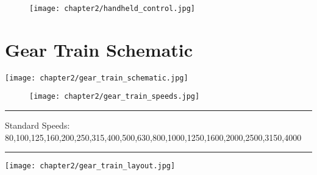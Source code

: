 \begin{figure}[h]
    \centering
    \texttt{[image: chapter2/handheld\_control.jpg]}
\end{figure}

\section{Gear Train Schematic}
\setcounter{section}{10}
\begin{minipage}{\textwidth}
    \begin{adjustwidth}{-2cm}{-3cm}
        \centering
        \texttt{[image: chapter2/gear\_train\_schematic.jpg]}
    \end{adjustwidth}
    \label{fig:gear_train}
\end{minipage}


\vspace{-.5cm}

\begin{figure}[h]
    \centering
    \texttt{[image: chapter2/gear\_train\_speeds.jpg]}
\end{figure}

\noindent \rule{1.08\textwidth}{0.5pt}
\footnotesize Standard Speeds: 80,100,125,160,200,250,315,400,500,630,800,1000,1250,1600,2000,2500,3150,4000
\rule{1.08\textwidth}{0.5pt}

\vspace{.5cm}

\texttt{[image: chapter2/gear\_train\_layout.jpg]}
